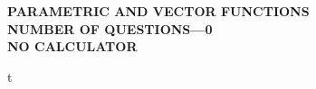 \documentclass[letterstyle,12pt]{extarticle}
\newcounter{qcounter}
\newcommand{\ques}[1]{\begin{minipage}{0.9 \textwidth} \item #1 \end{minipage} \vspace{4ex}}
\begin{document}
\begin{center}
    {\bf
    \MakeUppercase{Parametric and Vector Functions\\[1ex]
    NUMBER OF QUESTIONS—0 \\[1ex] 
    NO CALCULATOR \\[5ex]
    }}
\end{center}

\begin{list}{\textbf{.}~}{}
\setlength\itemsep{3em}

\ques{
t
}

\end{list}

\clearpage 

\twocolumn

\begin{supertabular}{ll}

\end{supertabular}
\end{document}
